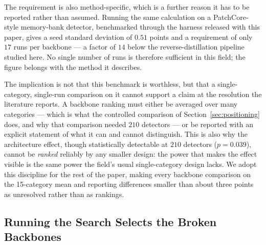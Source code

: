 The requirement is also method-specific, which is a further reason it has to be
reported rather than assumed. Running the same calculation on a PatchCore-style
memory-bank detector, benchmarked through the harness released with this paper,
gives a seed standard deviation of $0.51$ points and a requirement of only $17$
runs per backbone --- a factor of $14$ below the reverse-distillation pipeline
studied here. No single number of runs is therefore sufficient in this field; the
figure belongs with the method it describes.

The implication is not that this benchmark is worthless, but that a
single-category, single-run comparison on it cannot support a claim at the
resolution the literature reports. A backbone ranking must either be averaged over
many categories --- which is what the controlled comparison of
Section~\ref{sec:positioning} does, and why that comparison needed $210$ detectors --- or be reported with an explicit statement of what
it can and cannot distinguish. This is also why the architecture effect, though
statistically detectable at $210$ detectors ($p = 0.039$), cannot be
\emph{ranked} reliably by any smaller design: the power that makes the effect
visible is the same power the field's usual single-category design lacks. We adopt
this discipline for the rest of the paper, making every backbone comparison on the
15-category mean and reporting differences smaller than about three points as
unresolved rather than as rankings.

\subsection{Running the Search Selects the Broken Backbones}
\label{subsec:search_vs_random}


